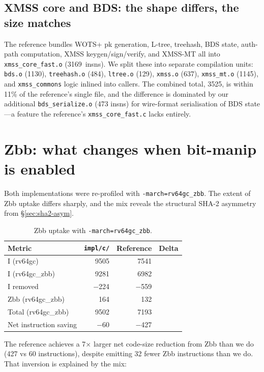 \documentclass[11pt,a4paper]{article}
\begin{document}
\subsection{XMSS core and BDS: the shape differs, the size matches}

The reference bundles WOTS+ pk generation, L-tree, treehash, BDS
state, auth-path computation, XMSS keygen/sign/verify, and XMSS-MT
all into \texttt{xmss\_core\_fast.o} (3169~insns).  We split these
into separate compilation units: \texttt{bds.o} (1130),
\texttt{treehash.o} (484), \texttt{ltree.o} (129), \texttt{xmss.o}
(637), \texttt{xmss\_mt.o} (1145), and \texttt{xmss\_commons} logic
inlined into callers.  The combined total, 3525, is within 11\% of
the reference's single file, and the difference is dominated by our
additional \texttt{bds\_serialize.o} (473 insns) for wire-format
serialisation of BDS state---a feature the reference's
\texttt{xmss\_core\_fast.c} lacks entirely.

\section{Zbb: what changes when bit-manip is enabled}

Both implementations were re-profiled with \texttt{-march=rv64gc\_zbb}.
The extent of Zbb uptake differs sharply, and the mix reveals the
structural SHA-2 asymmetry from \S\ref{sec:sha2-asym}.

\begin{table}[ht]
\centering
\caption{Zbb uptake with \texttt{-march=rv64gc\_zbb}.}
\label{tab:zbb-cmp}
\begin{tabular}{@{}lrrr@{}}
\toprule
Metric                         & \texttt{impl/c/} & Reference & Delta \\
\midrule
I   (rv64gc)                   & 9505 & 7541 & \\
I   (rv64gc\_zbb)              & 9281 & 6982 & \\
\quad I removed                & $-$224 & $-$559 & \\
Zbb (rv64gc\_zbb)              &  164 &  132 & \\
Total (rv64gc\_zbb)            & 9502 & 7193 & \\
\quad Net instruction saving   & $-$60 & $-$427 & \\
\bottomrule
\end{tabular}
\end{table}

The reference achieves a 7$\times$ larger net code-size reduction from
Zbb than we do (427 vs 60 instructions), despite emitting 32 fewer Zbb
instructions than we do.  That inversion is explained by the mix:
\end{document}
